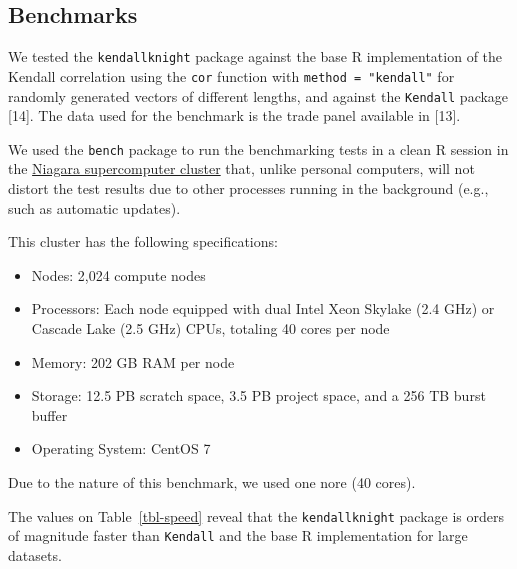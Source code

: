 \documentclass[
  10pt,
  letterpaper,
]{article}
\providecommand{\tightlist}{%
  \setlength{\itemsep}{0pt}\setlength{\parskip}{0pt}}\usepackage{longtable,booktabs,array}
\begin{document}
\subsection{Benchmarks}\label{benchmarks}

We tested the \texttt{kendallknight} package against the base R
implementation of the Kendall correlation using the \texttt{cor}
function with \texttt{method\ =\ "kendall"} for randomly generated
vectors of different lengths, and against the \texttt{Kendall} package
{[}14{]}. The data used for the benchmark is the trade panel available
in {[}13{]}.

We used the \texttt{bench} package to run the benchmarking tests in a
clean R session in the \href{https://scinethpc.ca/niagara/}{Niagara
supercomputer cluster} that, unlike personal computers, will not distort
the test results due to other processes running in the background (e.g.,
such as automatic updates).

This cluster has the following specifications:

\begin{itemize}
\tightlist
\item
  Nodes: 2,024 compute nodes
\item
  Processors: Each node equipped with dual Intel Xeon Skylake (2.4 GHz)
  or Cascade Lake (2.5 GHz) CPUs, totaling 40 cores per node
\item
  Memory: 202 GB RAM per node
\item
  Storage: 12.5 PB scratch space, 3.5 PB project space, and a 256 TB
  burst buffer
\item
  Operating System: CentOS 7
\end{itemize}

Due to the nature of this benchmark, we used one nore (40 cores).

The values on Table~\ref{tbl-speed} reveal that the
\texttt{kendallknight} package is orders of magnitude faster than
\texttt{Kendall} and the base R implementation for large datasets.
\end{document}

